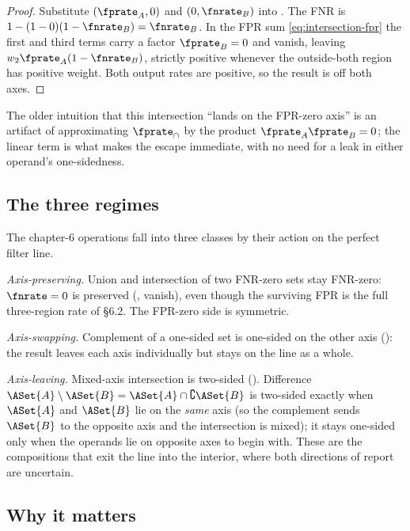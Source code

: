 \begin{proof}
Substitute $(\fprate_A, 0)$ and $(0, \fnrate_B)$ into
. The FNR is $1 - (1 - 0)(1 - \fnrate_B) =
\fnrate_B$. In the FPR sum \eqref{eq:intersection-fpr} the first and third
terms carry a factor $\fprate_B = 0$ and vanish, leaving $w_2 \fprate_A(1 -
\fnrate_B)$, strictly positive whenever the outside-both region has positive
weight. Both output rates are positive, so the result is off both axes.
\end{proof}

The older intuition that this intersection ``lands on the FPR-zero axis'' is
an artifact of approximating $\fprate_\cap$ by the product $\fprate_A
\fprate_B = 0$; the linear term is what makes the escape immediate, with no
need for a leak in either operand's one-sidedness.

\subsection*{The three regimes}

The chapter-6 operations fall into three classes by their action on the
perfect filter line.

\emph{Axis-preserving.} Union and intersection of two FNR-zero sets stay
FNR-zero: $\fnrate = 0$ is preserved (,
 vanish), even though the surviving FPR is the
full three-region rate of §6.2. The FPR-zero side is symmetric.

\emph{Axis-swapping.} Complement of a one-sided set is one-sided on the other
axis (): the result leaves each axis
individually but stays on the line as a whole.

\emph{Axis-leaving.} Mixed-axis intersection is two-sided
(). Difference $\ASet{A} \setminus
\ASet{B} = \ASet{A} \cap \complement \ASet{B}$ is two-sided exactly when
$\ASet{A}$ and $\ASet{B}$ lie on the \emph{same} axis (so the complement
sends $\ASet{B}$ to the opposite axis and the intersection is mixed); it
stays one-sided only when the operands lie on opposite axes to begin with.
These are the compositions that exit the line into the interior, where both
directions of report are uncertain.

\subsection*{Why it matters}

